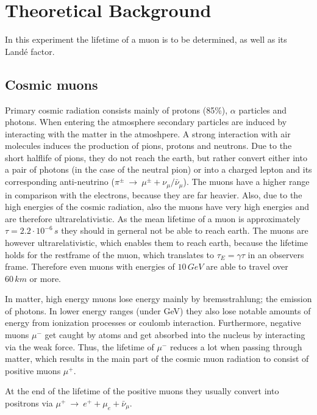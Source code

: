 \documentclass{include/thesisclass3}
\newcommand{\cc}{\cdot}
\newcommand{\df}{\rightarrow}
\newcommand{\e}[1]{\,\si{#1}}
\begin{document}
	\FrontMatter
	
	\tableofcontents                  
	\newpage
	\MainMatter


\chapter{Theoretical Background}

In this experiment the lifetime of a muon is to be determined, as well as its Landé factor.

\section{Cosmic muons}
Primary cosmic radiation consists mainly of protons (85\%), $\alpha$ particles and photons.
When entering the atmosphere secondary particles are induced by interacting with the matter in the atmoshpere.
A strong interaction with air molecules induces the production of pions, protons and neutrons.
Due to the short halflife of pions, they do not reach the earth, but rather convert either into a pair of photons (in the case of the neutral pion) or into a charged lepton and its corresponding anti-neutrino ($\pi^\pm ~\df~ \mu^\pm + \nu_\mu/\bar{\nu}_\mu$).
The muons have a higher range in comparison with the electrons, because they are far heavier.
Also, due to the high energies of the cosmic radiation, also the muons have very high energies and are therefore ultrarelativistic.
As the mean lifetime of a muon is approximately $\tau = 2.2\cc10^{-6}\e{s}$ they should in gerneral not be able to reach earth.
The muons are however ultrarelativistic, which enables them to reach earth, because the lifetime holds for the restframe of the muon, which translates to $\tau_E = \gamma \tau$ in an observers frame.
Therefore even muons with energies of $10\e{GeV}$ are able to travel over $60\e{km}$ or more.

In matter, high energy muons lose energy mainly by bremsstrahlung; the emission of photons.
In lower energy ranges (under GeV) they also lose notable amounts of energy from ionization processes or coulomb interaction.
Furthermore, negative muons $\mu^-$ get caught by atoms and get absorbed into the nucleus by interacting via the weak force.
Thus, the lifetime of $\mu^-$ reduces a lot when passing through matter, which results in the main part of the cosmic muon radiation to consist of positive muons $\mu^+$.

At the end of the lifetime of the positive muons they usually convert into positrons via $\mu^+ ~\df~e^+ + \mu_e + \bar{\nu}_\mu$. 
\end{document}
